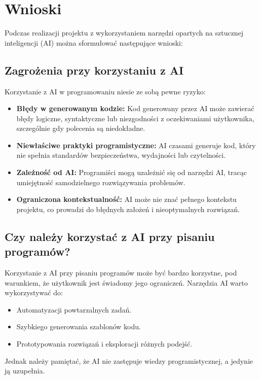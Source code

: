 \newpage
\section{Wnioski}

Podczas realizacji projektu z wykorzystaniem narzędzi opartych na sztucznej inteligencji (AI) można sformułować następujące wnioski:

\subsection{Zagrożenia przy korzystaniu z AI}

Korzystanie z AI w programowaniu niesie ze sobą pewne ryzyko:
\begin{itemize}
  \item \textbf{Błędy w generowanym kodzie:} Kod generowany przez AI może zawierać błędy logiczne, syntaktyczne lub niezgodności z oczekiwaniami użytkownika, szczególnie gdy polecenia są niedokładne.
  \item \textbf{Niewłaściwe praktyki programistyczne:} AI czasami generuje kod, który nie spełnia standardów bezpieczeństwa, wydajności lub czytelności.
  \item \textbf{Zależność od AI:} Programiści mogą uzależnić się od narzędzi AI, tracąc umiejętność samodzielnego rozwiązywania problemów.
  \item \textbf{Ograniczona kontekstualność:} AI może nie znać pełnego kontekstu projektu, co prowadzi do błędnych założeń i nieoptymalnych rozwiązań.
\end{itemize}

\subsection{Czy należy korzystać z AI przy pisaniu programów?}

Korzystanie z AI przy pisaniu programów może być bardzo korzystne, pod warunkiem, że użytkownik jest świadomy jego ograniczeń. Narzędzia AI warto wykorzystywać do:
\begin{itemize}
  \item Automatyzacji powtarzalnych zadań.
  \item Szybkiego generowania szablonów kodu.
  \item Prototypowania rozwiązań i eksploracji różnych podejść.
\end{itemize}

Jednak należy pamiętać, że AI nie zastępuje wiedzy programistycznej, a jedynie ją uzupełnia.

